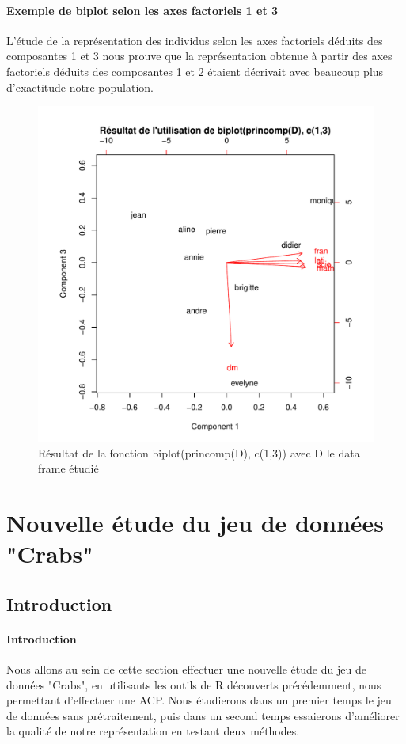 \documentclass{report}
\begin{document}
\paragraph{Exemple de biplot selon les axes factoriels 1 et 3}
L'étude de la représentation des individus selon les axes factoriels déduits des composantes 1 et 3 nous prouve que la représentation obtenue à partir des axes factoriels déduits des composantes 1 et 2 étaient décrivait avec beaucoup plus d'exactitude notre population.
\begin{figure}[h!]
\begin{center}
    \includegraphics[width=\textwidth]{biplot2.pdf}
    \caption{Résultat de la fonction biplot(princomp(D), c(1,3)) avec D le data frame étudié}
\end{center}
\end{figure}

\section{Nouvelle étude du jeu de données "Crabs"}
\subsection{Introduction}
\paragraph{Introduction}
Nous allons au sein de cette section effectuer une nouvelle étude du jeu de données "Crabs", en utilisants les outils de R découverts précédemment, nous permettant d'effectuer une ACP. Nous étudierons dans un premier temps le jeu de données sans prétraitement, puis dans un second temps essaierons d'améliorer la qualité de notre représentation en testant deux méthodes.
\end{document}

